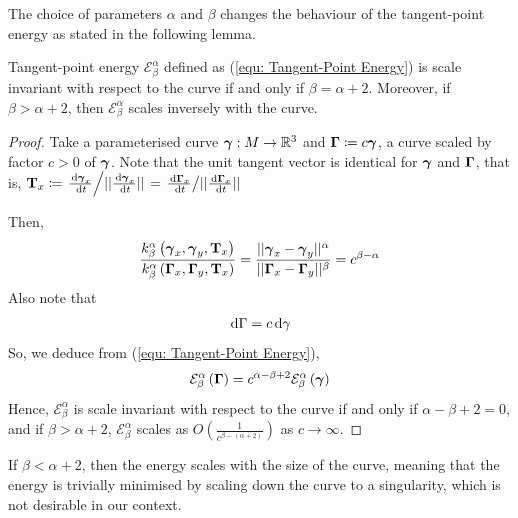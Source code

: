 \documentclass[../dissertation.tex]{subfiles}
\begin{document}
The choice of parameters $\alpha$ and $\beta$ changes the behaviour of the tangent-point energy as stated in the following lemma.
\begin{lemma}
    \label{lemma: Scale-Invariance}
    Tangent-point energy $\mathcal{E}_{\beta}^{\alpha}$ defined as (\ref{equ: Tangent-Point Energy}) is scale invariant with respect to the curve if and only if $\beta = \alpha + 2$.
    Moreover, if $\beta > \alpha + 2$, then $\mathcal{E}_{\beta}^{\alpha}$ scales inversely with the curve.
    \begin{proof}
        Take a parameterised curve $\boldsymbol{\gamma}:M \rightarrow \mathbb{R}^3$ and $\boldsymbol{\Gamma} \coloneqq c \boldsymbol{\gamma}$, a curve scaled by factor $c>0$ of $\boldsymbol{\gamma}$.
        Note that the unit tangent vector is identical for $\boldsymbol{\gamma}$ and $\boldsymbol{\Gamma}$, that is, $\mathbf{T}_x \coloneqq \left. \frac{\, \text{d} \boldsymbol{\gamma}_x}{\, \text{d} t} \middle/ \lvert \lvert \frac{\, \text{d} \boldsymbol{\gamma}_x}{\, \text{d} t} \rvert \rvert \right. = \left. \frac{\, \text{d} \boldsymbol{\Gamma}_x}{\, \text{d} t} \middle/ \lvert \lvert \frac{\, \text{d} \boldsymbol{\Gamma}_x}{\, \text{d} t} \rvert \rvert \right. $

        Then,
        \begin{equation}
            \frac{k_{\beta}^{\alpha} \left( \boldsymbol{\gamma}_x, \boldsymbol{\gamma}_y, \mathbf{T}_x \right)}{k_{\beta}^{\alpha} \left( \boldsymbol{\Gamma}_x, \boldsymbol{\Gamma}_y, \mathbf{T}_x \right)}
            =
            \frac{\lvert \lvert \boldsymbol{\gamma}_x - \boldsymbol{\gamma}_y \rvert \rvert^{\alpha}}{\lvert \lvert \boldsymbol{\Gamma}_x - \boldsymbol{\Gamma}_y \rvert \rvert^{\beta}} = c^{\beta - \alpha}
        \end{equation}
        Also note that
        \begin{equation}
            \, \text{d} \Gamma = c \, \text{d} \gamma
        \end{equation}
        So, we deduce from (\ref{equ: Tangent-Point Energy}),
        \begin{equation}
            \mathcal{E}_{\beta}^{\alpha} \left( \boldsymbol{\Gamma} \right) = c^{\alpha - \beta + 2} \mathcal{E}_{\beta}^{\alpha} \left( \boldsymbol{\gamma} \right)
        \end{equation}
        Hence, $\mathcal{E}_{\beta}^{\alpha}$ is scale invariant with respect to the curve if and only if $\alpha - \beta + 2 = 0$, and if $\beta > \alpha + 2$, $\mathcal{E}_{\beta}^{\alpha}$ scales as $O\left( \frac{1}{c^{\beta - \left( \alpha + 2 \right)}} \right)$ as $c \rightarrow \infty$.
    \end{proof}
\end{lemma}

\begin{remark}
    If $\beta < \alpha + 2$, then the energy scales with the size of the curve,
    meaning that the energy is trivially minimised by scaling down the curve to a singularity,
    which is not desirable in our context.
\end{remark}
\end{document}

